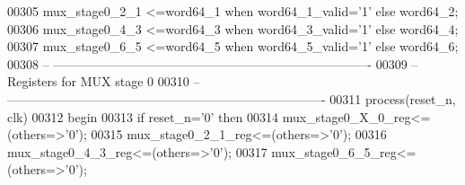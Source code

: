 \begin{DoxyCode}
00305 \textcolor{vhdlchar}{mux_stage0_2_1}  \textcolor{vhdlchar}{<=}\textcolor{vhdlchar}{word64_1} \textcolor{keywordflow}{when} \textcolor{vhdlchar}{word64_1_valid}\textcolor{vhdlchar}{=}\textcolor{vhdlchar}{'}\textcolor{vhdllogic}{}\textcolor{vhdllogic}{1}\textcolor{vhdlchar}{'} \textcolor{keywordflow}{else} \textcolor{vhdlchar}{word64_2};
00306 \textcolor{vhdlchar}{mux_stage0_4_3}  \textcolor{vhdlchar}{<=}\textcolor{vhdlchar}{word64_3} \textcolor{keywordflow}{when} \textcolor{vhdlchar}{word64_3_valid}\textcolor{vhdlchar}{=}\textcolor{vhdlchar}{'}\textcolor{vhdllogic}{}\textcolor{vhdllogic}{1}\textcolor{vhdlchar}{'} \textcolor{keywordflow}{else} \textcolor{vhdlchar}{word64_4};
00307 \textcolor{vhdlchar}{mux_stage0_6_5}  \textcolor{vhdlchar}{<=}\textcolor{vhdlchar}{word64_5} \textcolor{keywordflow}{when} \textcolor{vhdlchar}{word64_5_valid}\textcolor{vhdlchar}{=}\textcolor{vhdlchar}{'}\textcolor{vhdllogic}{}\textcolor{vhdllogic}{1}\textcolor{vhdlchar}{'} \textcolor{keywordflow}{else} \textcolor{vhdlchar}{word64_6};
00308 \textcolor{keyword}{-- ----------------------------------------------------------------------------}
00309 \textcolor{keyword}{-- Registers for MUX stage 0}
00310 \textcolor{keyword}{-- ----------------------------------------------------------------------------  }
00311   \textcolor{keywordflow}{process}(reset_n, clk)
00312 \textcolor{vhdlkeyword}{    begin}
00313       \textcolor{keywordflow}{if} \textcolor{vhdlchar}{reset_n}\textcolor{vhdlchar}{=}\textcolor{vhdlchar}{'}\textcolor{vhdllogic}{}\textcolor{vhdllogic}{0}\textcolor{vhdlchar}{'} \textcolor{keywordflow}{then}
00314             \textcolor{vhdlchar}{mux_stage0_X_0_reg}\textcolor{vhdlchar}{<=}\textcolor{vhdlchar}{(}\textcolor{keywordflow}{others}\textcolor{vhdlchar}{=}\textcolor{vhdlchar}{>}\textcolor{vhdlchar}{'}\textcolor{vhdllogic}{}\textcolor{vhdllogic}{0}\textcolor{vhdlchar}{'}\textcolor{vhdlchar}{)};
00315             \textcolor{vhdlchar}{mux_stage0_2_1_reg}\textcolor{vhdlchar}{<=}\textcolor{vhdlchar}{(}\textcolor{keywordflow}{others}\textcolor{vhdlchar}{=}\textcolor{vhdlchar}{>}\textcolor{vhdlchar}{'}\textcolor{vhdllogic}{}\textcolor{vhdllogic}{0}\textcolor{vhdlchar}{'}\textcolor{vhdlchar}{)};
00316             \textcolor{vhdlchar}{mux_stage0_4_3_reg}\textcolor{vhdlchar}{<=}\textcolor{vhdlchar}{(}\textcolor{keywordflow}{others}\textcolor{vhdlchar}{=}\textcolor{vhdlchar}{>}\textcolor{vhdlchar}{'}\textcolor{vhdllogic}{}\textcolor{vhdllogic}{0}\textcolor{vhdlchar}{'}\textcolor{vhdlchar}{)};
00317             \textcolor{vhdlchar}{mux_stage0_6_5_reg}\textcolor{vhdlchar}{<=}\textcolor{vhdlchar}{(}\textcolor{keywordflow}{others}\textcolor{vhdlchar}{=}\textcolor{vhdlchar}{>}\textcolor{vhdlchar}{'}\textcolor{vhdllogic}{}\textcolor{vhdllogic}{0}\textcolor{vhdlchar}{'}\textcolor{vhdlchar}{)};

\end{DoxyCode}
